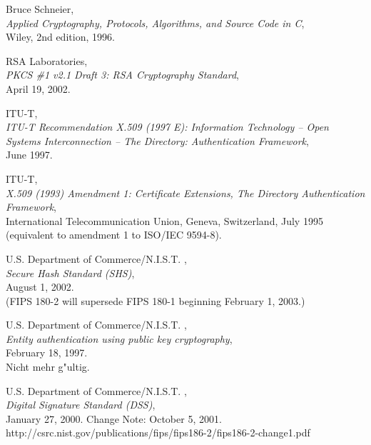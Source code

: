 \begin{thebibliography}{99999}

  
    Bruce Schneier, \\
    {\em Applied Cryptography, Protocols, Algorithms, and Source Code in C}, \\
    Wiley, 2nd edition, 1996.

 RSA Laboratories, \\ 
     
    {\em PKCS \#1 v2.1 Draft 3: RSA Cryptography Standard}, \\
    April 19, 2002.

 ITU-T, \\
    {\em ITU-T Recommendation X.509 (1997 E): Information Technology -- 
    Open Systems Interconnection -- The Directory: Authentication Framework},\\
    June 1997.

 ITU-T, \\ 
      
    {\em X.509 (1993) Amendment 1: Certificate Extensions, The Directory
    Authentication Framework},\\ 
    International Telecommunication Union, Geneva, Switzerland, July 1995\\
    (equivalent to amendment 1 to ISO/IEC 9594-8).

 U.S. Department of Commerce/N.I.S.T. ,
     \\
    {\em Secure Hash Standard (SHS)}, \\
    August 1, 2002.\\
    (FIPS 180-2 will supersede FIPS 180-1 beginning February 1, 2003.)

 U.S. Department of Commerce/N.I.S.T. ,
     \\
    {\em Entity authentication using public key cryptography}, \\
    February 18, 1997.\\
    Nicht mehr g"ultig.

 U.S. Department of Commerce/N.I.S.T. ,
     \\
    {\em Digital Signature Standard (DSS)}, \\
    January 27, 2000. Change Note: October 5, 2001.\\
    http://csrc.nist.gov/publications/fips/fips186-2/fips186-2-change1.pdf

\end{thebibliography}
                                                          


